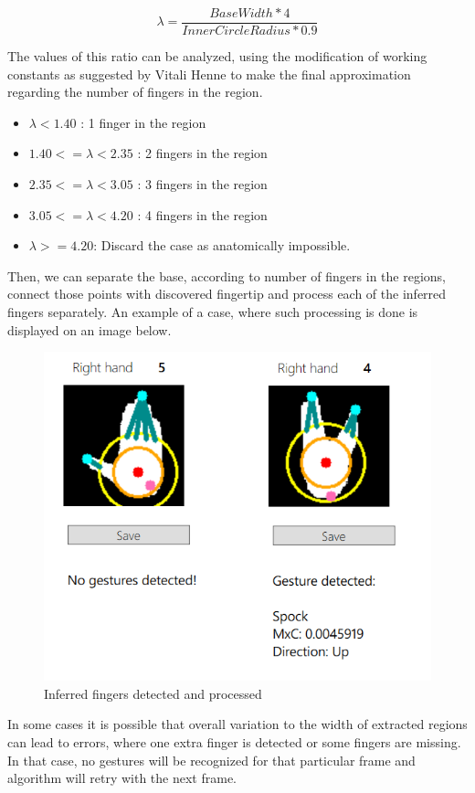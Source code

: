 \documentclass[a4paper,11pt,oneside]{article}
\begin{document}
\[\lambda = \frac{BaseWidth * 4}{InnerCircleRadius * 0.9} \]

The values of this ratio can be analyzed, using the modification of working constants as suggested by Vitali Henne \cite{VH01} to make the final approximation regarding the number of fingers in the region.

\begin{itemize}
\item $\lambda < 1.40$ : 1 finger in the region
\item $1.40 <= \lambda < 2.35$ : 2 fingers in the region
\item $2.35 <= \lambda < 3.05$ : 3 fingers in the region
\item $3.05 <= \lambda < 4.20$ : 4 fingers in the region
\item $\lambda >= 4.20$: Discard the case as anatomically impossible.
\end{itemize}

Then, we can separate the base, according to number of fingers in the regions, connect those points with discovered fingertip and process each of the inferred fingers separately. An example of a case, where such processing is done is displayed on an image below.

\begin{figure}[H]
\centering
\includegraphics[scale=1]{inferred-fingers.png}
\caption{Inferred fingers detected and processed}
\end{figure}

In some cases it is possible that overall variation to the width of extracted regions can lead to errors, where one extra finger is detected or some fingers are missing. In that case, no gestures will be recognized for that particular frame and algorithm will retry with the next frame.
\end{document}
